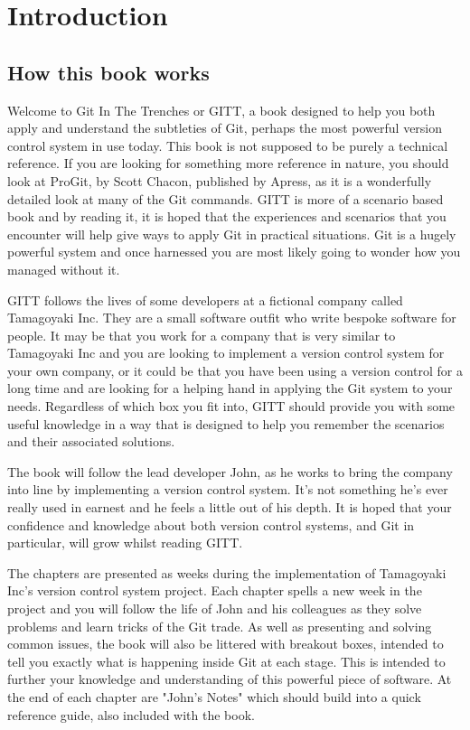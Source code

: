 \cleardoublepage
\chapter{Introduction}
\section{How this book works}

Welcome to Git In The Trenches or GITT, a book designed to help you both apply and understand the subtleties of Git, perhaps the most powerful version control system in use today.  This book is not supposed to be purely a technical reference.  If you are looking for something more reference in nature, you should look at ProGit, by Scott Chacon, published by Apress, as it is a wonderfully detailed look at many of the Git commands.  GITT is more of a scenario based book and by reading it, it is hoped that the experiences and scenarios that you encounter will help give ways to apply Git in practical situations.  Git is a hugely powerful system and once harnessed you are most likely going to wonder how you managed without it.

GITT follows the lives of some developers at a fictional company called Tamagoyaki Inc.  They are a small software outfit who write bespoke software for people.  It may be that you work for a company that is very similar to Tamagoyaki Inc and you are looking to implement a version control system for your own company, or it could be that you have been using a version control for a long time and are looking for a helping hand in applying the Git system to your needs.  Regardless of which box you fit into, GITT should provide you with some useful knowledge in a way that is designed to help you remember the scenarios and their associated solutions.

The book will follow the lead developer John, as he works to bring the company into line by implementing a version control system.  It's not something he's ever really used in earnest and he feels a little out of his depth.  It is hoped that your confidence and knowledge about both version control systems, and Git in particular, will grow whilst reading GITT.  

The chapters are presented as weeks during the implementation of Tamagoyaki Inc's version control system project.  Each chapter spells a new week in the project and you will follow the life of John and his colleagues as they solve problems and learn tricks of the Git trade.  As well as presenting and solving common issues, the book will also be littered with breakout boxes, intended to tell you exactly what is happening inside Git at each stage.  This is intended to further your knowledge and understanding of this powerful piece of software.  At the end of each chapter are "John's Notes" which should build into a quick reference guide, also included with the book.

